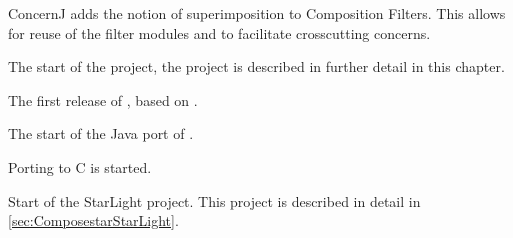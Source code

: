 \begin{description}[noitemsep,style=nextline,leftmargin=15mm]
            ConcernJ adds the notion of superimposition to Composition Filters.
            This allows for reuse of the filter modules and to facilitate crosscutting concerns.
\item[2003] The start of the \Compose* project, the project is described in further detail in this chapter.
\item[2004] The first release of \Compose*, based on \dotNET.
\item[2005] The start of the Java port of \Compose*.
\item[2006] Porting \Compose* to C is started.
\item[2006] Start of the StarLight project. This project is described in detail in \autoref{sec:ComposestarStarLight}.
\end{description}